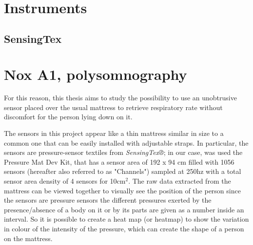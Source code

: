 \begin{comment}



\subsection{Heart Rate Data Collection}
\subsubsection{Heart rate at rest with constrained breath rate}
This part of the protocol aims to provide a known rhythm to the breath rate according to an acoustic time. The sound will indicate when they start to inhale and exhale to the participants.

\subsubsection{Heart rate at rest with constrained breath rate during mattress movement}
This part of the protocol aims to provide a known rhythm to the breath rate according to an acoustic time while the mattress is moving. The sound will indicate when they start to inhale and exhale to the participants.

\end{comment}

\section{Instruments}
\subsection{SensingTex}
\section{Nox A1, polysomnography}
For this reason, this thesis aims to study the possibility to use an unobtrusive sensor placed over the usual mattress to retrieve 
respiratory rate without discomfort for the person lying down on it. 


The sensors in this project appear like a thin mattress similar in size to a common one that can be easily installed with adjustable straps.
In particular, the sensors are pressure-sensor textiles from \textit{SensingTex®}; in our case, was used the Pressure Mat Dev Kit,
 that has a sensor area of 192 x 94 cm filled with 1056 sensors (hereafter also referred to as "Channels") sampled at 250hz
 with a total sensor area density of 4 sensors for 10cm$^2$.
 The raw data extracted from the mattress can be viewed together to visually see the position of the person since the sensors are pressure sensors
the different pressures exerted by the presence/absence of a body on it or by its parts are given as a number inside an interval. 
So it is possible to create a heat map (or heatmap) to show the variation in colour of the intensity of the pressure, which can create the shape of
a person on the mattress.

